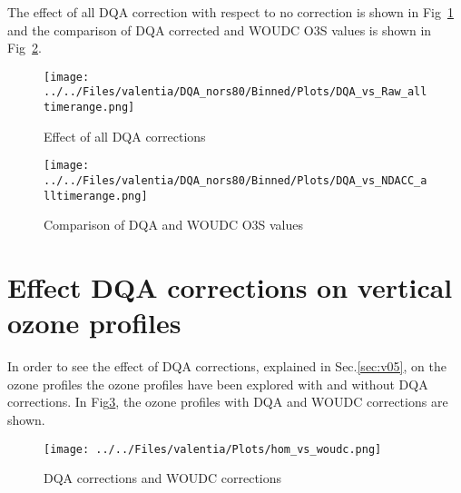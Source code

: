 \documentclass{article}
\begin{document}
The effect of all DQA correction with respect to no correction is shown in Fig~\ref{fig:dqa_all} and the comparison of DQA corrected and
WOUDC O3S values is shown in Fig~\ref{fig:fig_dqa_ndacc}.

                        \begin{figure}
        \centering
\texttt{[image: ../../Files/valentia/DQA\_nors80/Binned/Plots/DQA\_vs\_Raw\_alltimerange.png]}
    \caption{Effect of all DQA corrections}
            \label{fig:dqa_all}
    \end{figure}
%
                        \begin{figure}
        \centering
\texttt{[image: ../../Files/valentia/DQA\_nors80/Binned/Plots/DQA\_vs\_NDACC\_alltimerange.png]}
    \caption{Comparison of DQA and WOUDC O3S values}
            \label{fig:fig_dqa_ndacc}
    \end{figure}
%
    \section{Effect DQA corrections on vertical ozone profiles }
%
    In order to see the effect of DQA corrections, explained in Sec.\ref{sec:v05}, on the ozone profiles
the ozone profiles have been
explored with and without DQA corrections. In Fig\ref{fig:pl_ndacc}, the ozone profiles with DQA and
WOUDC corrections are shown.
                                \begin{figure}
        \centering
\texttt{[image: ../../Files/valentia/Plots/hom\_vs\_woudc.png]}
    \caption{DQA corrections and WOUDC corrections}
            \label{fig:pl_ndacc}
    \end{figure}
\end{document}
